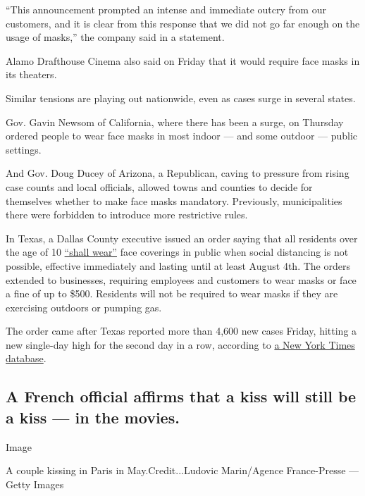 ``This announcement prompted an intense and immediate outcry from our
customers, and it is clear from this response that we did not go far
enough on the usage of masks,'' the company said in a statement.

Alamo Drafthouse Cinema also said on Friday that it would require face
masks in its theaters.

Similar tensions are playing out nationwide, even as cases surge in
several states.

Gov. Gavin Newsom of California, where there has been a surge, on
Thursday ordered people to wear face masks in most indoor --- and some
outdoor --- public settings.

And Gov. Doug Ducey of Arizona, a Republican, caving to pressure from
rising case counts and local officials, allowed towns and counties to
decide for themselves whether to make face masks mandatory. Previously,
municipalities there were forbidden to introduce more restrictive rules.

In Texas, a Dallas County executive issued an order saying that all
residents over the age of 10
\href{https://www.dallascounty.org/Assets/uploads/docs/covid-19/orders-media/061920-Amended-SupplementalOrderonContinuingRequirements.pdf}{``shall
wear''} face coverings in public when social distancing is not possible,
effective immediately and lasting until at least August 4th. The orders
extended to businesses, requiring employees and customers to wear masks
or face a fine of up to \$500. Residents will not be required to wear
masks if they are exercising outdoors or pumping gas.

The order came after Texas reported more than 4,600 new cases Friday,
hitting a new single-day high for the second day in a row, according to
\href{https://www.nytimes3xbfgragh.onion/interactive/2020/us/texas-coronavirus-cases.html}{a
New York Times database}.

\hypertarget{a-french-official-affirms-that-a-kiss-will-still-be-a-kiss--in-the-movies}{%
\subsection{A French official affirms that a kiss will still be a kiss
--- in the
movies.}\label{a-french-official-affirms-that-a-kiss-will-still-be-a-kiss--in-the-movies}}

Image

A couple kissing in Paris in May.Credit...Ludovic Marin/Agence
France-Presse --- Getty Images


